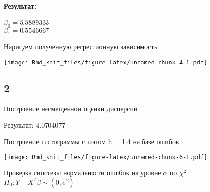 \documentclass[]{article}
\newenvironment{Shaded}{\begin{snugshade}}{\end{snugshade}}
\newcommand{\DecValTok}[1]{\textcolor[rgb]{0.00,0.00,0.81}{#1}}
\newcommand{\KeywordTok}[1]{\textcolor[rgb]{0.13,0.29,0.53}{\textbf{#1}}}
\newcommand{\NormalTok}[1]{#1}
\newcommand{\OperatorTok}[1]{\textcolor[rgb]{0.81,0.36,0.00}{\textbf{#1}}}
\let\oldparagraph\paragraph
\renewcommand{\paragraph}[1]{\oldparagraph{#1}\mbox{}}
\begin{document}
\hypertarget{ux440ux435ux437ux443ux43bux44cux442ux430ux442}{%
\paragraph{Результат:}\label{ux440ux435ux437ux443ux43bux44cux442ux430ux442}}

\(\beta_0 = 5.5889333\)\\
\(\beta_1 = 0.5546667\)

Нарисуем полученную регрессионную зависимость

\texttt{[image: Rmd\_knit\_files/figure-latex/unnamed-chunk-4-1.pdf]}

\hypertarget{section-1}{%
\subsection{2}\label{section-1}}

Построение несмещенной оценки дисперсии

\begin{Shaded}
\end{Shaded}

Результат: \(4.0704077\)

Построение гистограммы с шагом h = 1.4 на базе ошибок

\texttt{[image: Rmd\_knit\_files/figure-latex/unnamed-chunk-6-1.pdf]}

Проверка гипотезы нормальности ошибок на уровне \(\alpha\) по \(\chi^2\)
\(H_0: Y-X^T \beta\sim(0,\sigma^2)\)
\end{document}
